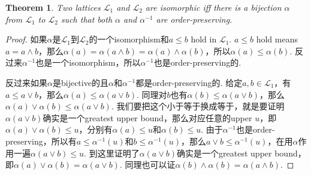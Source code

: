 \documentclass{article}
\newtheorem{theorem}{Theorem}[section]
\newcommand\lattice{\mathcal{L}}
\begin{document}
\begin{theorem}
\rm Two lattices $\lattice_1$ and $\lattice_2$ are isomorphic iff there is a bijection $\alpha$ from $\lattice_1$ to
$\lattice_2$ such that both $\alpha$ and $\alpha^{-1}$ are {\color{red} order-preserving}. 
\end{theorem}

\begin{proof}
如果$\alpha$是$\lattice_1$到$\lattice_2$的一个isomorphism和$a \leq b$ hold in $\lattice_1$. $a \leq b$ hold means $a = a \wedge b$，那么$\alpha(a) = \alpha(a \wedge b) = \alpha(a) \wedge \alpha(b)$，所以$\alpha(a) \leq \alpha(b)$. 反过来$\alpha^{-1}$也是一个isomorphism，所以$\alpha^{-1}$也是order-preserving的.

反过来如果$\alpha$是bijective的且$\alpha$和$\alpha^{-1}$都是order-preserving的. 给定$a,b \in \lattice_1$，有$a \leq a \vee b$，那么$\alpha(a) \leq \alpha(a \vee b )$. 同理对$b$也有$\alpha(b) \leq \alpha(a \vee b)$，那么$\alpha(a) \vee \alpha(b) \leq \alpha(a \vee b)$. 我们要把这个小于等于换成等于，就是要证明$\alpha(a \vee b)$确实是一个greatest upper bound，那么对应任意的upper $u$，即$\alpha(a) \vee \alpha(b) \leq u$，分别有$\alpha(a) \leq u$和$\alpha(b) \leq u$. 由于$\alpha^{-1}$也是order-preserving，所以有$a \leq \alpha^{-1}(u)$和$b \leq \alpha^{-1}(u)$，那么$a \vee b \leq \alpha^{-1}(u)$，在用$\alpha$作用一遍$\alpha(a \vee b) \leq u$. 到这里证明了$\alpha(a \vee b)$确实是一个greatest upper bound，即$\alpha(a) \vee \alpha(b) = \alpha(a \vee b)$. 同理也可以证$\alpha(b) \wedge \alpha(b) = \alpha(a \wedge b)$.
\end{proof}
\end{document}
